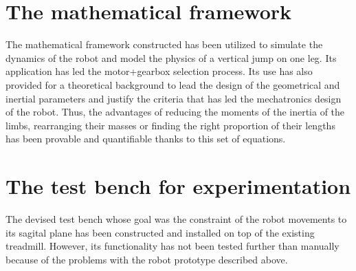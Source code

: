 \section{The mathematical framework} %
\label{sec:the_mathematical_framework}
The mathematical framework constructed has been utilized to simulate the dynamics of the robot and model the physics of a vertical jump on one leg.
Its application has led the motor+gearbox selection process.
Its use has also provided for a theoretical background to lead the design of the geometrical and inertial parameters and justify the criteria that has led the mechatronics design of the robot.
Thus, the advantages of reducing the moments of the inertia of the limbs, rearranging their masses or finding the right proportion of their lengths has been provable and quantifiable thanks to this set of equations.


\section{The test bench for experimentation} %
\label{sec:the_test_bench}
The devised test bench whose goal was the constraint of the robot movements to its sagital plane has been constructed and installed on top of the existing treadmill.
However, its functionality has not been tested further than manually because of the problems with the robot prototype described above.
